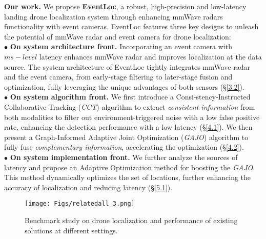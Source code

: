 \noindent \textbf{Our work.}
We propose \textbf{EventLoc}, a robust, high-precision and low-latency landing drone localization system through enhancing mmWave radars functionality with event cameras.
EventLoc features three key designs to unleash the potential of mmWave radar and event camera for drone localization: \\
\noindent $\bullet$ \textbf{On system architecture front.}
Incorporating an event camera with $ms-level$ latency enhances mmWave radar and improves localization at the data source.
The system architecture of EventLoc tightly integrates mmWave radar and the event camera, from early-stage filtering to later-stage fusion and optimization, fully leveraging the unique advantages of both sensors (§\ref{3.2}).\\
\noindent $\bullet$ \textbf{On system algorithm front.}
We first introduce a Consi-stency-Instructed Collaborative Tracking (\textit{CCT}) algorithm to extract \textit{consistent information} from both modalities to filter out environment-triggered noise with a low false positive rate, enhancing the detection performance with a low latency (§\ref{4.1}). 
We then present a Graph-Informed Adaptive Joint Optimization (\textit{GAJO}) algorithm to fully fuse \textit{complementary information}, accelerating the optimization (§\ref{4.2}). \\
\noindent $\bullet$ \textbf{On system implementation front.}
We further analyze the sources of latency and propose an Adaptive Optimization method for boosting the \textit{GAJO}. 
This method dynamically optimizes the set of locations, further enhancing the accuracy of localization and reducing latency (§\ref{5.1}).
\begin{figure}[t]
    \setlength{\abovecaptionskip}{0.2cm} %
    \setlength{\belowcaptionskip}{-0.3cm}
    \setlength{\subfigcapskip}{-0.25cm}
    \centering
        \texttt{[image: Figs/relatedall\_3.png]}
        \vspace{-0.5cm}
    \caption{Benchmark study on drone localization and performance of existing solutions at different settings.}
    \label{relatedwork}
    \vspace{-0.4cm}
\end{figure} 


